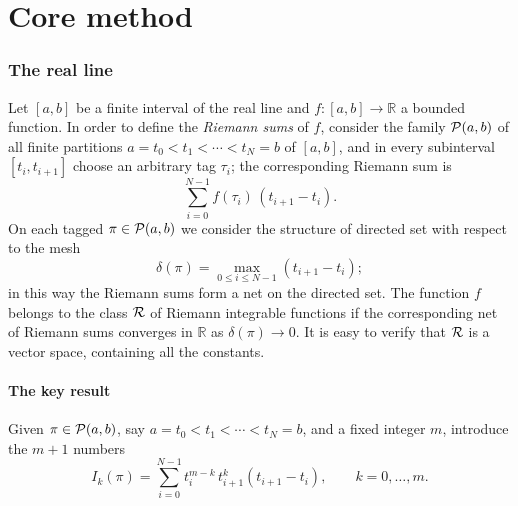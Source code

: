 \documentclass[11pt,fleqn]{article}
\def\R{\mathbb R}
\def\ds{\displaystyle}
\theoremstyle{plain}
\theoremstyle{remark}
\begin{document}
\part{Core method}

\section{The real line}

Let $[a,b]$ be a finite interval of the real line and $f\colon[a,b]\to\R$
a bounded function. In order to define the \emph{Riemann sums} of $f$,
consider the family ${\cal P}(a,b)$ of all finite partitions
$a=t_0<t_1<\cdots<t_N=b$ of $[a,b]$, and in every subinterval
$[t_i,t_{i+1}]$ choose an arbitrary tag $\tau_i$; the corresponding
Riemann sum is
\[
\sum_{i=0}^{N-1}f(\tau_i)\,(t_{i+1}-t_i).
\]
On each tagged $\pi\in{\cal P}(a,b)$ we consider the structure of directed
set with respect to the mesh
\[
\delta(\pi)=\max_{0\le i\le N-1}(t_{i+1}-t_i);
\]
in this way the Riemann sums form a net on the directed set. The function
$f$ belongs to the class ${\cal R}$ of Riemann integrable functions if the
corresponding net of Riemann sums converges in $\R$ as $\delta(\pi)\to0$.
It is easy to verify that ${\cal R}$ is a vector space, containing all
the constants.

\subsection{The key result}\label{sec:real-key}

Given $\pi\in{\cal P}(a,b)$, say $a=t_0<t_1<\cdots<t_N=b$, and a fixed
integer $m$, introduce the $m+1$ numbers
\[
I_k(\pi)=\ds\sum_{i=0}^{N-1}t_i^{m-k}\,t_{i+1}^k(t_{i+1}-t_i),
\qquad k=0,\ldots,m.
\]
\end{document}
